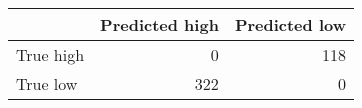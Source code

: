 \begin{tabular}{lrr}
\hline
           &   Predicted high &   Predicted low \\
\hline
 True high &                0 &             118 \\
 True low  &              322 &               0 \\
\hline
\end{tabular}